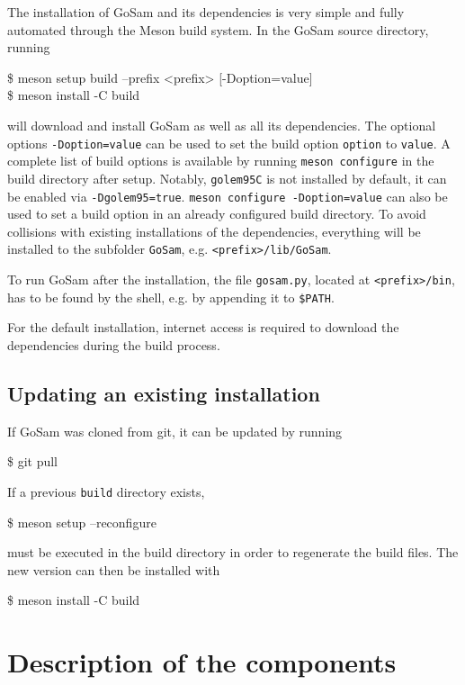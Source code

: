 \documentclass[11pt,a4paper]{refrep}
\newcommand{\gosam}{{\sc GoSam}\xspace}
\newcommand{\golemVC}{{\tt golem95C}\xspace}
\begin{document}
The installation of GoSam and its dependencies is very simple and fully automated through the Meson
build system. In the GoSam source directory, running 
\begin{example}
\$ meson setup build --prefix <prefix> [-Doption=value] \\
\$ meson install -C build
\end{example}
will download and install GoSam as well as all its dependencies. The optional options {\tt -Doption=value} can
be used to set the build option {\tt option} to {\tt value}. A complete list of build options is available by
running {\tt meson configure} in the build directory after setup. Notably, \golemVC is not installed by default, it can be enabled via \texttt{-Dgolem95=true}. {\tt meson configure -Doption=value} can also
be used to set a build option in an already configured build directory. To avoid collisions with existing
installations of the dependencies, everything will be installed to the subfolder {\tt GoSam},
e.g. {\tt <prefix>/lib/GoSam}.

To run \gosam after the installation, the file \texttt{gosam.py}, located at \texttt{<prefix>/bin}, has to be found by the shell, e.g. by appending it to \texttt{\$PATH}.

For the default installation, internet access is required to download the dependencies during the build process.

\subsection{Updating an existing installation}

If GoSam was cloned from git, it can be updated by running
\begin{example}
\$ git pull
\end{example}
If a previous \texttt{build} directory exists, 
\begin{example}
\$ meson setup --reconfigure
\end{example}
must be executed in the build directory in order to regenerate the build files. The new version can then be installed with 
\begin{example}
\$ meson install -C build
\end{example}


\section{Description of the components}
\end{document}
